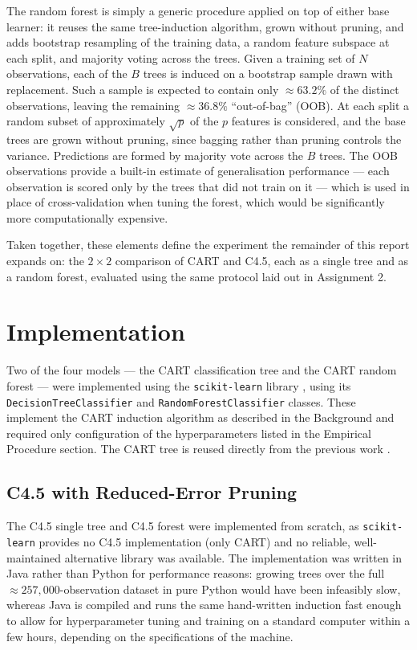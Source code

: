 \documentclass[conference]{IEEEtran}
\begin{document}
The random forest is simply a generic procedure applied on top of either base learner: it reuses
the same tree-induction algorithm, grown without pruning, and adds bootstrap resampling of
the training data, a random feature subspace at each split, and majority voting across the trees.
Given a training set of $N$ observations, each of the $B$ trees is induced on a bootstrap sample
drawn with replacement. Such a sample is expected to contain only
$\approx 63.2\%$ of the distinct observations, leaving the remaining $\approx 36.8\%$
``out-of-bag'' (OOB). At each split a random subset of approximately $\sqrt{p}$ of the
$p$ features is considered, and the base trees are grown without pruning, since bagging
rather than pruning controls the variance. Predictions are formed by majority vote across
the $B$ trees. The OOB observations provide a built-in estimate
of generalisation performance --- each observation is scored only by the trees that did
not train on it --- which is used in place of cross-validation when tuning the
forest, which would be significantly more computationally expensive.

Taken together, these elements define the experiment the remainder of this report
expands on: the $2\times2$ comparison of CART and C4.5, each as a single tree and as a
random forest, evaluated using the same protocol laid out in Assignment 2.

\section{Implementation} %

Two of the four models --- the CART classification tree and the CART random forest ---
were implemented using the \texttt{scikit-learn} library \cite{scikit-learn}, using its
\texttt{DecisionTreeClassifier} and \texttt{RandomForestClassifier} classes.
These implement the CART induction algorithm as described in the Background and required only
configuration of the hyperparameters listed in the Empirical Procedure section. The CART
tree is reused directly from the previous work \cite{a2}.

\subsection{C4.5 with Reduced-Error Pruning} %

The C4.5 single tree and C4.5 forest were implemented from scratch, as \texttt{scikit-learn}
provides no C4.5 implementation (only CART) and no reliable, well-maintained alternative
library was available. The implementation was written in Java rather than Python for
performance reasons: growing trees over the full $\approx\!257{,}000$-observation dataset 
in pure Python would have been infeasibly slow, whereas Java is compiled and runs 
the same hand-written induction fast enough to allow for hyperparameter tuning and training
on a standard computer within a few hours, depending on the specifications of the machine.
\end{document}
